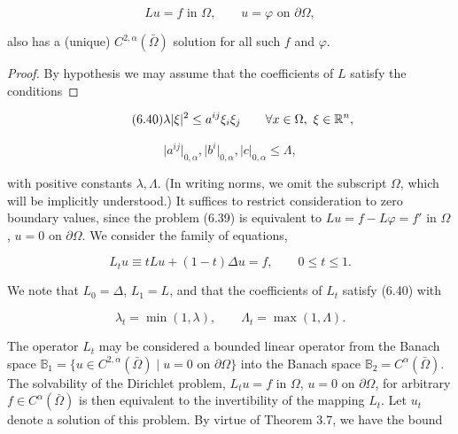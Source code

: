 \begin{equation}
\tag{6.39}
Lu=f \text{ in } \Omega,\qquad u=\varphi \text{ on } \partial\Omega,
\end{equation}

also has a (unique) $C^{2,\alpha}(\bar{\Omega})$ solution for all such $f$ and $\varphi$.

\begin{proof}
By hypothesis we may assume that the coefficients of $L$ satisfy the conditions
\end{proof}

\begin{equation}
\tag{6.40}
\lambda \lvert \xi\rvert^2 \le a^{ij}\xi_i\xi_j \qquad \forall x\in\Omega,\ \xi\in\mathbb{R}^n,
\end{equation}

\begin{equation}
\lvert a^{ij}\rvert_{0,\alpha}, \lvert b^i\rvert_{0,\alpha}, \lvert c\rvert_{0,\alpha} \le \Lambda,
\end{equation}




with positive constants $\lambda, \Lambda$. (In writing norms, we omit the subscript $\Omega$, which will be implicitly understood.) It suffices to restrict consideration to zero boundary values, since the problem (6.39) is equivalent to $Lu=f-L\varphi=f'$ in $\Omega$, $u=0$ on $\partial\Omega$.
We consider the family of equations,

\begin{equation}
\tag{6.41}
L_tu \equiv tLu + (1-t)\Delta u = f, \qquad 0 \le t \le 1.
\end{equation}

We note that $L_0 = \Delta$, $L_1 = L$, and that the coefficients of $L_t$ satisfy (6.40) with

\[
\lambda_t = \min(1,\lambda), \qquad \Lambda_t = \max(1,\Lambda).
\]

The operator $L_t$ may be considered a bounded linear operator from the Banach space $\mathbb{B}_1 = \{u \in C^{2,\alpha}(\bar{\Omega}) \mid u = 0 \text{ on } \partial\Omega\}$ into the Banach space $\mathbb{B}_2 = C^\alpha(\bar{\Omega})$. The solvability of the Dirichlet problem, $L_tu=f$ in $\Omega$, $u=0$ on $\partial\Omega$, for arbitrary $f \in C^\alpha(\bar{\Omega})$ is then equivalent to the invertibility of the mapping $L_t$. Let $u_t$ denote a solution of this problem. By virtue of Theorem 3.7, we have the bound

